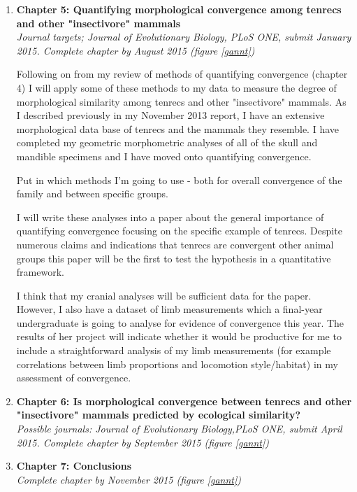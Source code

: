\documentclass[12pt,a4paper]{article}
\begin{document}
\begin{enumerate}


\item \textbf{Chapter 5: Quantifying morphological convergence among tenrecs and other "insectivore" mammals}\\
\textit{Journal targets; Journal of Evolutionary Biology, PLoS ONE, submit January 2015. Complete chapter by August 2015 (figure \ref{gannt})}

Following on from my review of methods of quantifying convergence (chapter 4) I will apply some of these methods to my data to measure the degree of morphological similarity among tenrecs and other "insectivore" mammals.
As I described previously in my November 2013 report, I have an extensive morphological data base of tenrecs and the mammals they resemble. I have completed my geometric morphometric analyses of all of the skull and mandible specimens and I have moved onto quantifying convergence.


Put in which methods I'm going to use - both for overall convergence of the family and between specific groups.

I will write these analyses into a paper about the general importance of quantifying convergence focusing on the specific example of tenrecs. Despite numerous claims and indications that tenrecs are convergent other animal groups \citep[e.g.][]{Olson2013, Eisenberg1969, Soarimalala2011} this paper will be the first to test the hypothesis in a quantitative framework.

I think that my cranial analyses will be sufficient data for the paper. However, I also have a dataset of limb measurements which a final-year undergraduate is going to analyse for evidence of convergence this year. The results of her project will indicate whether it would be productive for me to include a straightforward analysis of my limb measurements (for example correlations between limb proportions and locomotion style/habitat) in my assessment of convergence.


\item \textbf{Chapter 6: Is morphological convergence between tenrecs and other "insectivore" mammals predicted by ecological similarity?}\\
\textit{Possible journals: Journal of Evolutionary Biology,PLoS ONE, submit April 2015. Complete chapter by September 2015 (figure \ref{gannt}) } 


\item \textbf{Chapter 7: Conclusions}\\
\textit{Complete chapter by November 2015 (figure \ref{gannt})}


\end{enumerate}
\end{document}
